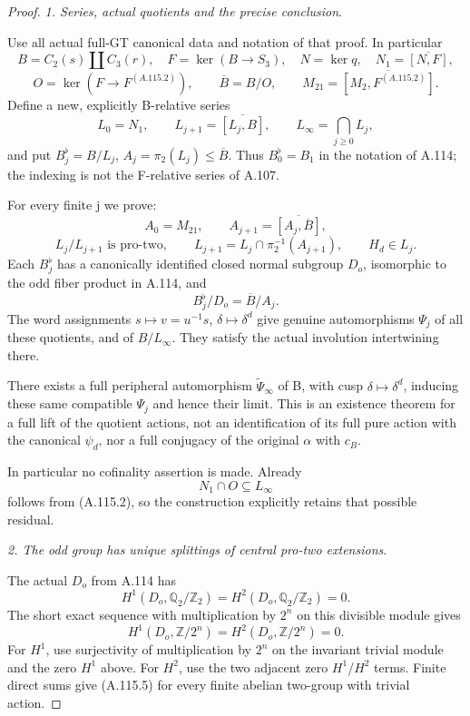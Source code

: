 \begin{proof}
\medskip\noindent\emph{1. Series, actual quotients and the precise conclusion}.

Use all actual full-GT canonical data and notation of that proof. In particular
\[
B=C_2(s)\amalg C_3(r),\quad F=\ker(B\to S_3),\quad
N=\ker q,\quad N_1=\overline{[N,F]},
\]
\[
O=\ker(F\to F^{(A.115.2)}),\qquad \overline B=B/O,\qquad
M_{21}=\overline{[M_2,F^{(A.115.2)}]}.
\]
Define a new, explicitly B-relative series
\[
L_0=N_1,\qquad L_{j+1}=\overline{[L_j,B]},\qquad
L_\infty=\bigcap_{j\ge0}L_j,
\]
and put \(B_j^\flat=B/L_j\), \(A_j=\pi_2(L_j)\le\overline B\). Thus \(B_0^\flat=B_1\) in the notation of A.114; the indexing is not the F-relative series of A.107.

For every finite j we prove:
\[
A_0=M_{21},\qquad A_{j+1}=\overline{[A_j,\overline B]},       \tag{A.115.1}
\]
\[
L_j/L_{j+1}\text{ is pro-two},\qquad
L_{j+1}=L_j\cap\pi_2^{-1}(A_{j+1}),\qquad H_d\in L_j.       \tag{A.115.2}
\]
Each \(B_j^\flat\) has a canonically identified closed normal subgroup \(D_o\), isomorphic to the odd fiber product in A.114, and
\[
B_j^\flat/D_o=\overline B/A_j.                              \tag{A.115.3}
\]
The word assignments \(s\mapsto v=u^{-1}s\), \(\delta\mapsto\delta^d\) give genuine automorphisms \(\Psi_j\) of all these quotients, and of \(B/L_\infty\). They satisfy the actual involution intertwining there.

There exists a full peripheral automorphism \(\widetilde\Psi_\infty\) of B, with cusp \(\delta\mapsto\delta^d\), inducing these same compatible \(\Psi_j\) and hence their limit. This is an existence theorem for a full lift of the quotient actions, not an identification of its full pure action with the canonical \(\psi_d\), nor a full conjugacy of the original \(\alpha\) with \(c_B\).

In particular no cofinality assertion is made. Already
\[
N_1\cap O\subseteq L_\infty                                  \tag{A.115.4}
\]
follows from (A.115.2), so the construction explicitly retains that possible residual.

\medskip\noindent\emph{2. The odd group has unique splittings of central pro-two extensions}.

The actual \(D_o\) from A.114 has
\[
H^1(D_o,\mathbb Q_2/\mathbb Z_2)
=H^2(D_o,\mathbb Q_2/\mathbb Z_2)=0.
\]
The short exact sequence with multiplication by \(2^n\) on this divisible module gives
\[
H^1(D_o,\mathbb Z/2^n)=H^2(D_o,\mathbb Z/2^n)=0.             \tag{A.115.5}
\]
For \(H^1\), use surjectivity of multiplication by \(2^n\) on the invariant trivial module and the zero \(H^1\) above. For \(H^2\), use the two adjacent zero \(H^1\)/\(H^2\) terms. Finite direct sums give (A.115.5) for every finite abelian two-group with trivial action.


\end{proof}
